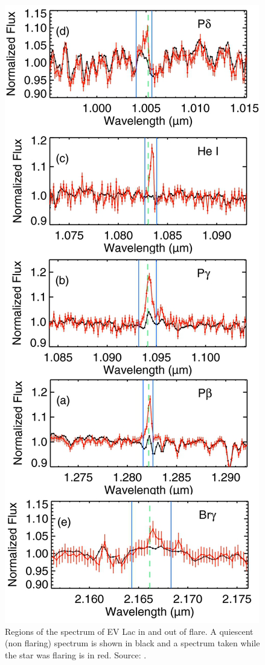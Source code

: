 \begin{figure}
    \centering
    \includegraphics[width=\textwidth,height=0.95\textheight,keepaspectratio]{Flare2.png}
    \caption{Regions of the spectrum of EV Lac in and out of flare. A quiescent (non flaring) spectrum is shown in black and a spectrum taken while the star was flaring is in red. Source: \citet{2012Schmidt}.}
    \label{figFlareDia}
\end{figure}

